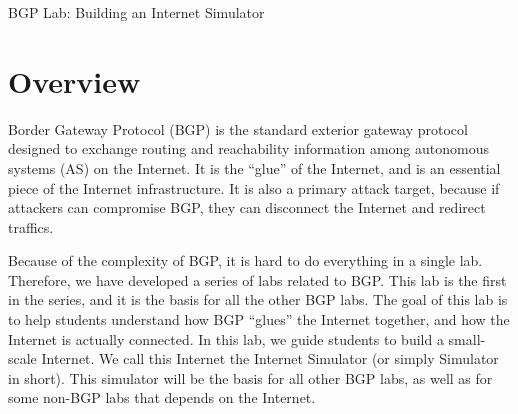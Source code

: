 
\newcommand{\commonfolder}{../../common-files}





\newcommand{\bgpFigs}{./Figs}




\begin{center}
{\LARGE BGP Lab: Building an Internet Simulator}
\end{center}




\section{Overview}

Border Gateway Protocol (BGP) is the standard exterior gateway protocol
designed to exchange routing and reachability information among autonomous
systems (AS) on the Internet. It is the ``glue'' of the Internet,
and is an essential piece of the Internet infrastructure. It is 
also a primary attack target, because if attackers can 
compromise BGP, they can disconnect the Internet and redirect traffics. 

Because of the complexity of BGP, it is hard to do everything in a single lab. 
Therefore, we have developed a series of labs related to BGP. This lab
is the first in the series, and it is the basis for all the other BGP labs.  
The goal of this lab is to help students understand how
BGP ``glues'' the Internet together, and how the Internet is actually
connected. In this lab, we guide students to build a small-scale Internet.
We call this Internet the Internet Simulator (or simply
Simulator in short). This simulator will be the basis for 
all other BGP labs, as well as for some non-BGP labs that 
depends on the Internet. 

